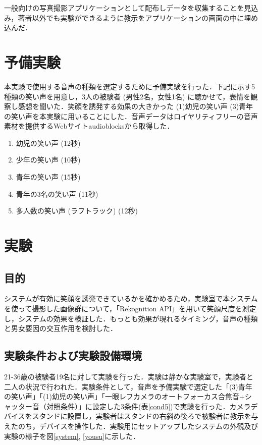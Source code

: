 \documentclass[report,10pt,uplatex,titlepage]{jsarticle}
\begin{document}
一般向けの写真撮影アプリケーションとして配布しデータを収集することを見込み，著者以外でも実験ができるように教示をアプリケーションの画面の中に埋め込んだ．


\section{予備実験}

本実験で使用する音声の種類を選定するために予備実験を行った．下記に示す5種類の笑い声を用意し，3人の被験者 (男性2名，女性1名) に聴かせて，表情を観察し感想を聞いた．笑顔を誘発する効果の大きかった (1)幼児の笑い声 (3)青年の笑い声を本実験に用いることにした．音声データはロイヤリティフリーの音声素材を提供するWebサイトaudioblocks\cite{AudioBlocks}から取得した．

\begin{enumerate}
 \item 幼児の笑い声 (12秒)
 \item 少年の笑い声 (10秒)
 \item 青年の笑い声 (15秒)
 \item 青年の3名の笑い声 (11秒)
 \item 多人数の笑い声 (ラフトラック) (12秒)
\end{enumerate}

\section{実験}

\subsection{目的}

システムが有効に笑顔を誘発できているかを確かめるため，実験室で本システムを使って撮影した画像群について，「Rekognition API」を用いて笑顔尺度を測定し，システムの効果を検証した．もっとも効果が現れるタイミング，音声の種類と男女要因の交互作用を検討した．

\subsection{実験条件および実験設備環境}


21-36歳の被験者19名に対して実験を行った．実験は静かな実験室で，実験者と二人の状況で行われた．実験条件として，音声を予備実験で選定した「(3)青年の笑い声」「(1)幼児の笑い声」「一眼レフカメラのオートフォーカス合焦音+シャッター音（対照条件）」に設定した3条件(表\ref{cond5})で実験を行った．カメラデバイスをスタンドに設置し，実験者はスタンドの右斜め後ろで被験者に教示を与えたのち，デバイスを操作した．実験用にセットアップしたシステムの外観及び実験の様子を図\ref{system}, \ref{yousu}に示した．
\end{document}
